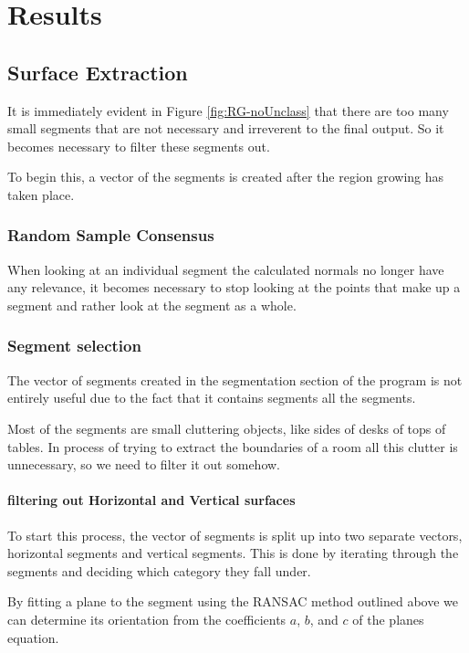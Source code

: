 \chapter{Results}


	\section{Surface Extraction}
	It is immediately evident in Figure \ref{fig:RG-noUnclass} that there are too many small segments that are not necessary and irreverent to the final output. So it becomes necessary to filter these segments out.
	
	To begin this, a vector of the segments is created after the region growing has taken place.

	\subsection{Random Sample Consensus}
			\label{RANSAC expl}
			When looking at an individual segment the calculated normals no longer have any relevance, it becomes necessary to stop looking at the points that make up a segment and rather look at the segment as a whole. 




	\subsection{Segment selection}
		The vector of segments created in the segmentation section of the program is not entirely useful due to the fact that it contains segments all the segments.
		
		Most of the segments are small cluttering objects, like sides of desks of tops of tables. In process of trying to extract the boundaries of a room all this clutter is unnecessary, so we need to filter it out somehow.
		\subsubsection{filtering out Horizontal and Vertical surfaces}
			To start this process, the vector of segments is split up into two separate vectors, horizontal segments and vertical segments. This is done by iterating through the segments and deciding which category they fall under.
			
			By fitting a plane to the segment using the RANSAC method outlined above we can determine its orientation from the coefficients $a$, $b$, and $c$ of the planes equation.
			

